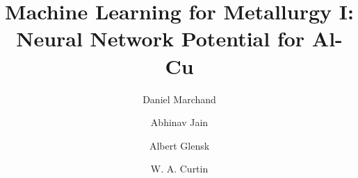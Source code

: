 \documentclass{article}
\begin{document}
\title{Machine Learning for Metallurgy I: Neural Network Potential for Al-Cu}

\author[1]{Daniel Marchand}
\author[1]{Abhinav Jain}
\author[1]{Albert Glensk}
\author[1]{W. A. Curtin}

\maketitle

\end{document}
